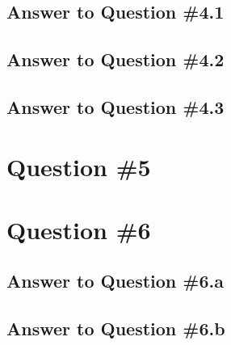 \documentclass[conference]{styles/acmsiggraph}
\begin{document}
\subsection{Answer to Question \#4.1}

\subsection{Answer to Question \#4.2}

\subsection{Answer to Question \#4.3}

\section{Question \#5}

\section{Question \#6}

\subsection{Answer to Question \#6.a}

\subsection{Answer to Question \#6.b}
\end{document}
